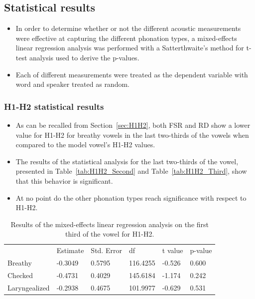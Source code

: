 \documentclass[12pt, letterpaper]{article}
\providecommand{\lsptoprule}{\midrule\toprule}
\providecommand{\lspbottomrule}{\bottomrule\midrule}
\begin{document}
\subsection{Statistical results} \label{sec:Stats}
\begin{itemize}
	\item In order to determine whether or not the different acoustic measurements were effective at capturing the different phonation types, a mixed-effects linear regression analysis was performed
	with a Satterthwaite’s method for t-test analysis used to derive the p-values. 
	\item Each of different measurements were treated as the dependent variable with word and speaker treated as random.
\end{itemize}

\subsubsection{H1-H2 statistical results} \label{sec:StatsH1H2}

\begin{itemize}
	\item As can be recalled from Section~\ref{sec:H1H2}, both FSR and RD show a lower value for H1-H2 for breathy vowels in the last two-thirds of the vowels when compared to the model vowel's H1-H2 values. 
	\item The results of the statistical analysis for the last two-thirds of the vowel, presented in Table~\ref{tab:H1H2_Second} and Table~\ref{tab:H1H2_Third}, show that this behavior is significant.
	\item At no point do the other phonation types reach significance with respect to H1-H2. 
\end{itemize}

\begin{table}[!h]
	\centering
	\caption{Results of the mixed-effects linear regression analysis on the first third of the vowel for H1-H2. }
	\label{tab:H1H2_First}
	 \begin{tabular}{llllll}
	  \lsptoprule
						&  Estimate  & Std. Error & df & t value & p-value \\
	  	Breathy   		&  -0.3049  &   0.5795 & 116.4255 &  -0.526  &  0.600 \\
		Checked    		&  -0.4731  &   0.4029 & 145.6184 &  -1.174  &  0.242 \\
		Laryngealized	&  -0.2938  &   0.4675 & 101.9977 &  -0.629  &  0.531 \\
	  \lspbottomrule
	 \end{tabular}
\end{table}
\end{document}
